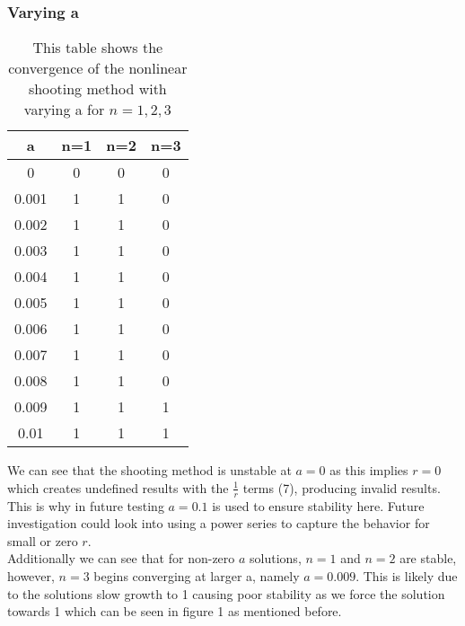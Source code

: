 \documentclass{article}
\begin{document}
\subsubsection{Varying a}
\begin{table}[H]
\centering
\caption{This table shows the convergence of the nonlinear shooting method with varying a for $n=1,2,3$}
\begin{tabular}{|c|c|c|c|}
\hline
a & n=1 & n=2 & n=3 \\
\hline
0 & 0 & 0 & 0\\
0.001 & 1 & 1 & 0\\
0.002 & 1 & 1 & 0\\
0.003 & 1 & 1 & 0\\
0.004 & 1 & 1 & 0\\
0.005 & 1 & 1 & 0\\
0.006 & 1 & 1 & 0\\
0.007 & 1 & 1 & 0\\
0.008 & 1 & 1 & 0\\
0.009 & 1 & 1 & 1\\
0.01  & 1 & 1 & 1\\
\hline
\end{tabular}
\end{table}
We can see that the shooting method is unstable at $a=0$ as this implies $r=0$ which creates undefined results with the $\frac{1}{r}$ terms (7), producing invalid results. This is why in future testing $a=0.1$ is used to ensure stability here. Future investigation could look into using a power series to capture the behavior for small or zero $r$. \\
Additionally we can see that for non-zero $a$ solutions, $n=1$ and $n=2$ are stable, however, $n=3$ begins converging at larger a, namely $a=0.009$. This is likely due to the solutions slow growth to 1 causing poor stability as we force the solution towards 1 which can be seen in figure 1 as mentioned before. 
\end{document}
